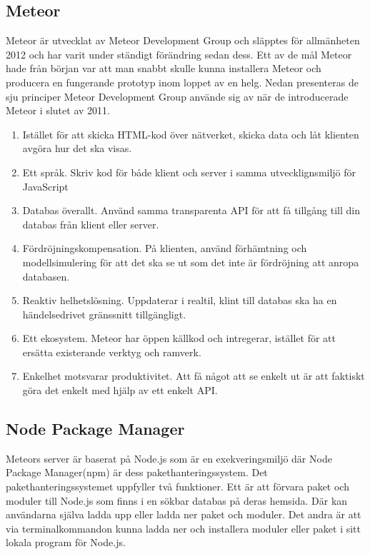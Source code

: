\subsection{Meteor}
\label{sec:johan_t-meteor}
Meteor är utvecklat av Meteor Development Group och släpptes för allmänheten 2012 och har varit under ständigt förändring sedan dess. Ett av de mål Meteor hade från början var att man snabbt skulle kunna installera Meteor och producera en fungerande prototyp inom loppet av en helg. Nedan presenteras de sju principer Meteor Development Group använde sig av när de introducerade Meteor i slutet av 2011.\cite{website:oldmeteor}
\begin{enumerate}
\item Istället för att skicka HTML-kod över nätverket, skicka data och låt klienten avgöra hur det ska visas.
\item Ett språk. Skriv kod för både klient och server i samma utvecklignsmiljö för JavaScript
\item Databas överallt. Använd samma transparenta API för att få tillgång till din databas från klient eller server.
\item Fördröjningskompensation. På klienten, använd förhämtning och modellsimulering för att det ska se ut som det inte är fördröjning att anropa databasen.
\item Reaktiv helhetslösning. Uppdaterar i realtil, klint till databas ska ha en händelsedrivet gränssnitt tillgängligt.
\item Ett ekosystem. Meteor har öppen källkod och intregerar, istället för att ersätta existerande verktyg och ramverk.
\item Enkelhet motsvarar produktivitet. Att få något att se enkelt ut är att faktiskt göra det enkelt med hjälp av ett enkelt API.
\end{enumerate}
\subsection{Node Package Manager}
\label{subsec:johan_t-npm}
Meteors server är baserat på Node.js som är en exekveringsmiljö där Node Package Manager(npm) är dess pakethanteringssystem. Det pakethanteringssystemet uppfyller två funktioner. Ett är att förvara paket och moduler till Node.js som finns i en sökbar databas på deras hemsida. Där kan användarna själva ladda upp eller ladda ner paket och moduler. Det andra är att via terminalkommandon kunna ladda ner och installera moduler eller paket i sitt lokala program för Node.js.
